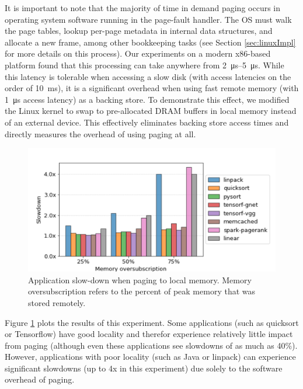 It is important to note that the majority of time in demand paging occurs in
operating system software running in the page-fault handler. The OS must walk
the page tables, lookup per-page metadata in internal data structures, and
allocate a new frame, among other \gls{bookkeeping} tasks (see Section
\ref{sec:linuxImpl} for more details on this process). Our experiments on a
modern x86-based platform found that this processing can take anywhere from
\SIrange{2}{5}{\micro\second}. While this latency is tolerable when accessing a
slow disk (with access latencies on the order of \SI{10}{\milli\second}), it is
a significant overhead when using fast remote memory (with
\SI{1}{\micro\second} access latency) as a backing store. To demonstrate this
effect, we modified the Linux kernel to swap to pre-allocated DRAM buffers in
local memory instead of an external device.  This effectively eliminates
backing store access times and directly measures the overhead of using paging
at all.

\begin{figure}[h]
    \centering
    \includegraphics[width=0.9\columnwidth]{figs/paging_overhead.png}
    \vspace{-5mm}
    \caption{Application slow-down when paging to local memory. Memory
oversubscription refers to the percent of peak memory that was stored remotely.}
    \label{fig:paging_overhead}
\end{figure}

Figure \ref{fig:paging_overhead} plots the results of this experiment. Some
applications (such as quicksort or Tensorflow) have good locality and therefor
experience relatively little impact from paging (although even these
applications see slowdowns of as much as 40\%). However, applications with
poor locality (such as Java or linpack) can experience significant slowdowns
(up to 4x in this experiment) due solely to the software overhead of paging. 

